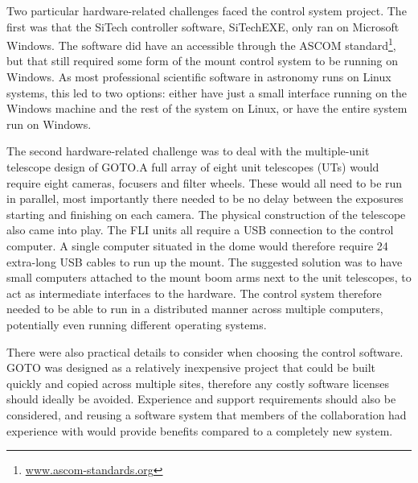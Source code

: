 \begin{colsection}
Two particular hardware-related challenges faced the control system project. The first was that the SiTech controller software, SiTechEXE, only ran on Microsoft Windows. The software did have an accessible  through the ASCOM standard\footnote{\url{www.ascom-standards.org}}, but that still required some form of the mount control system to be running on Windows. As most professional scientific software in astronomy runs on Linux systems, this led to two options: either have just a small interface running on the Windows machine and the rest of the system on Linux, or have the entire system run on Windows.

The second hardware-related challenge was to deal with the multiple-unit telescope design of GOTO.\@ A full array of eight unit telescopes (UTs) would require eight cameras, focusers and filter wheels. These would all need to be run in parallel, most importantly there needed to be no delay between the exposures starting and finishing on each camera. The physical construction of the telescope also came into play. The FLI units all require a USB connection to the control computer. A single computer situated in the dome would therefore require 24 extra-long USB cables to run up the mount. The suggested solution was to have small computers attached to the mount boom arms next to the unit telescopes, to act as intermediate interfaces to the hardware. The control system therefore needed to be able to run in a distributed manner across multiple computers, potentially even running different operating systems.

There were also practical details to consider when choosing the control software. GOTO was designed as a relatively inexpensive project that could be built quickly and copied across multiple sites, therefore any costly software licenses should ideally be avoided. Experience and support requirements should also be considered, and reusing a software system that members of the collaboration had experience with would provide benefits compared to a completely new system.

\end{colsection}


